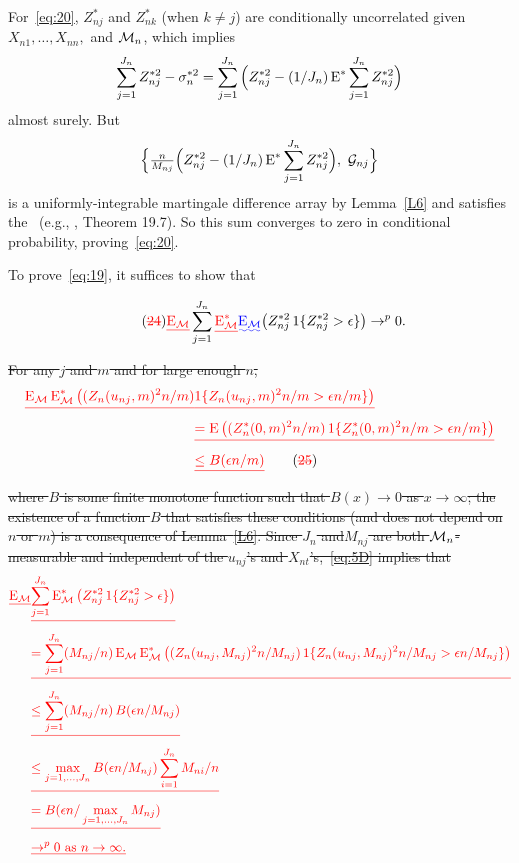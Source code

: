 \documentclass[11pt]{article}
\providecommand{\DIFadd}[1]{{\protect\color{blue}\uwave{#1}}} %
\providecommand{\DIFdel}[1]{{\protect\color{red}\sout{#1}}}                      %
\providecommand{\DIFaddbegin}{} %
\providecommand{\DIFaddend}{} %
\providecommand{\DIFdelbegin}{} %
\begin{document}
{For~\eqref{eq:20}, $Z_{nj}^*$ and $Z_{nk}^*$ (when $k \neq j$) are
conditionally uncorrelated given $X_{n1},\dots,X_{nn},$ and $\mathcal{M}_n$, which
implies
\begin{equation*}
  \sum_{j=1}^{J_n} Z_{nj}^{*2} - \sigma_n^{*2} =
  \sum_{j=1}^{J_n} \Big( Z_{nj}^{*2} - (1/J_n) \operatorname{E}^* \sum_{j=1}^{J_n} Z_{nj}^{*2} \Big)
\end{equation*}
almost surely. But
\begin{equation*}
   \Big\{\tfrac{n}{M_{nj}} \Big(Z_{nj}^{*2} - (1/J_n) \operatorname{E}^* \sum_{j=1}^{J_n} Z_{nj}^{*2}\Big),
   \ \mathcal{G}_{nj} \Big\}
\end{equation*}
is a uniformly-integrable martingale difference array
by Lemma~\ref{L6}
and satisfies the \lln\ (e.g., \citealp{Dav:94}, Theorem 19.7). So
this sum converges to zero in conditional probability, proving~\eqref{eq:20}.

To prove~\eqref{eq:19}, it suffices
\DIFaddbegin\DIFadd{(via the LIE and Lemma~\ref{L2}) }\DIFaddend
to show that
}\DIFdelbegin \DIFaddbegin
\begin{equation*}\label{eq:21D} \tag{\DIFdel{24}}
  \DIFdel{\Em} \sum_{j=1}^{J_n} \DIFdel{\Em^*} \DIFadd{\Em}
  \big(Z_{nj}^{*2} \ind\{Z_{nj}^{*2} > \epsilon\}\big) \to^p 0.
\end{equation*}
\DIFaddend
\DIFdel{For any $j$ and $m$ and for large enough $n$,
}\begin{align}
\DIFdel{\Em \Em^{*}\big((Z_n(u_{nj}, m)^2n/m) }&\DIFdel{\ind\{Z_n(u_{nj}, m)^2n/m > \epsilon n/m\}\big) \notag }\\
&\DIFdel{= \E \big((Z_n^{*}(0, m)^2n/m) \ind\{Z_n^{*}(0, m)^2n/m > \epsilon n/m\}\big) \notag }\\
&\DIFdel{\leq B(\epsilon n/m)
}\label{eq:5D} \tag{\DIFdel{25}}
\end{align}
\DIFdel{where $B$ is some finite monotone function such that $B(x) \to 0$
as $x \to \infty$; the existence of a function $B$ that satisfies these
conditions (and does not depend on $n$ or $m$) is a consequence of
Lemma~\ref{L6}. Since $J_n$ and$M_{nj}$ are both $\mathcal{M}_n$-measurable
and independent of the $u_{nj}$'s and $X_{nt}$'s,~\eqref{eq:5D}
implies that}
\begin{align*}
\DIFdel{\Em }&\DIFdel{\sum_{j=1}^{J_n} \Em^{*}\big(Z_{nj}^{*2} \ind\{Z_{nj}^{*2} > \epsilon\}\big) }\\
& \DIFdel{= \sum_{j=1}^{J_n} (M_{nj}/n) \Em \Em^{*}
\big((Z_n(u_{nj}, M_{nj})^2 n/M_{nj})
\ind\{Z_n(u_{nj}, M_{nj})^2n/M_{nj} > \epsilon n/M_{nj}\}\big) }\\
& \DIFdel{\leq \sum_{j=1}^{J_n} (M_{nj}/n) \, B(\epsilon n/M_{nj}) }\\
& \DIFdel{\leq \max_{j = 1,\dots,J_n} B(\epsilon n / M_{nj}) \sum_{i=1}^{J_n} M_{ni} / n }\\
& \DIFdel{= B(\epsilon n / \max_{j = 1,\dots,J_n} M_{nj}) }\\
& \DIFdel{\to^p 0 \text{\ as\ } n \to \infty.
}\end{align*}
\end{document}
